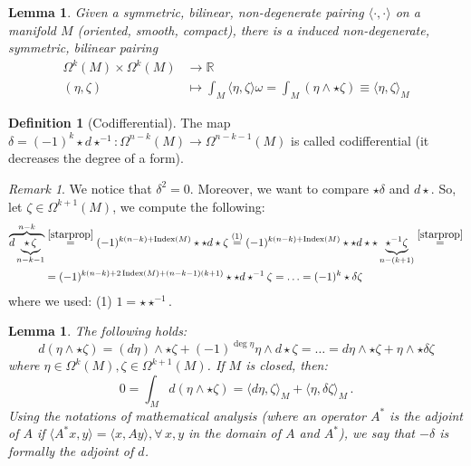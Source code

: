 \documentclass[a4paper,11pt,titlepage, article, oneside]{memoir}
\numberwithin{equation}{section}
\newtheorem{lemma}[theorem]{Lemma}
\theoremstyle{definition}
\newtheorem{definition}[theorem]{Definition}
\theoremstyle{remark}
\newtheorem{remark}[theorem]{Remark}
\DeclareMathOperator{\Index}{Index}
\newcommand{\rfield}{\mathbb{R}}
\begin{document}
\begin{lemma}
Given a symmetric, bilinear, non-degenerate pairing $\langle\cdot, \cdot \rangle$ on a manifold $M$ (oriented, smooth, compact), there is a induced non-degenerate, symmetric, bilinear pairing
\begin{align}
\Omega^k(M) \times \Omega^k(M) &\rightarrow \rfield \\
(\eta, \zeta) &\mapsto \int_M\langle \eta, \zeta \rangle \omega = \int_M (\eta \wedge \star \zeta) \equiv \langle \eta, \zeta \rangle_M \nonumber
\end{align}
 \end{lemma}
 
\begin{definition} [Codifferential]
The map $\delta = (-1)^k \star d \star^{-1} \colon \Omega^{n-k}(M) \rightarrow \Omega^{n-k-1}(M)$ is called codifferential (it decreases the degree of a form).
\end{definition}

\begin{remarkbox}\begin{remark}
We notice that $\delta^2 = 0$. Moreover, we want to compare $\star \delta $ and $d \star$. So, let $\zeta \in \Omega^{k+1}(M)$, we compute the following:
\begin{align*}
\overbrace{d \underbrace{\star\, \zeta}_{n-k-1}}^{n-k} &\overset{\eqref{starprop}}{=} (-1)^{k(n-k) + \Index(M)} \star \star d \star \zeta \overset{(1)}{=} (-1)^{k(n-k) + \Index(M)} \star \star d \star \star \underbrace{\star^{-1} \zeta}_{n-(k+1)} \overset{\eqref{starprop}}{=} \\
&=(-1)^{k(n-k) + 2\Index(M) + (n-k-1)(k+1)} \star \star d \star^{-1} \zeta = \ldots = (-1)^k \star \delta \zeta
\end{align*}
where we used: (1) $1=\star \star^{-1}$.
\end{remark}\end{remarkbox}

\begin{lemma} The following holds:
\begin{equation}
d(\eta \wedge \star \zeta) = (d\eta) \wedge \star \zeta + (-1)^{\deg \eta} \eta \wedge d \star \zeta = \ldots = d \eta \wedge \star \zeta + \eta \wedge \star \delta \zeta
\end{equation}
where $\eta \in \Omega^k(M), \zeta \in \Omega^{k+1}(M)$. If $M$ is closed, then:
\begin{equation}
0 = \int_M d(\eta \wedge \star \zeta) = \langle d \eta, \zeta \rangle_M + \langle \eta, \delta \zeta \rangle_M \, .
\end{equation}
Using the notations of mathematical analysis (where an operator $A^*$ is the adjoint of $A$ if $\langle A^*x,  y \rangle = \langle x, Ay \rangle, \forall\, x, y  $ in the domain of $A$ and $A^*$), we say that $-\delta$ is formally the adjoint of $d$.
\end{lemma}
\end{document}
